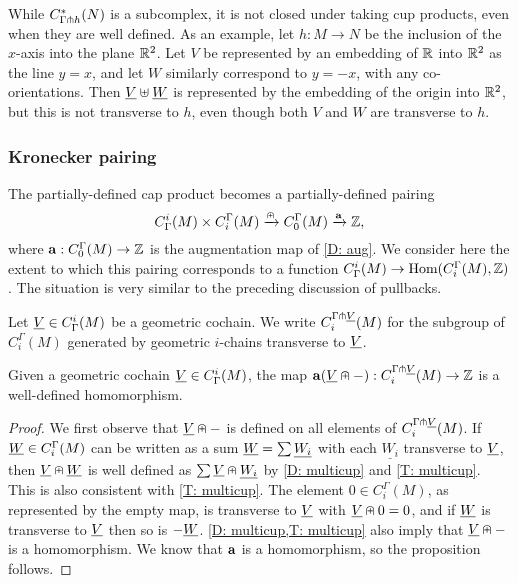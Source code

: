 \begin{remark}
While $C^*_{\Gamma\pitchfork h}(N)$ is a subcomplex, it is not closed under taking cup products, even when they are well defined. As an example, let $h \colon M \to N$ be the inclusion of the $x$-axis into the plane $\mathbb{R}^2$. Let $V$ be represented by an embedding of $\mathbb{R}$ into $\mathbb{R}^2$ as the line $y = x$, and let $W$ similarly correspond to $y = -x$, with any co-orientations. Then $\underline{V} \uplus \underline{W}$ is represented by the embedding of the origin into $\mathbb{R}^2$, but this is not transverse to $h$, even though both $V$ and $W$ are transverse to $h$.
\end{remark}

\subsubsection{Kronecker pairing}

The partially-defined cap product becomes a partially-defined pairing
$$C^i_\Gamma(M) \times C_i^\Gamma(M) \xrightarrow{\nplus} C_0^\Gamma(M) \xrightarrow{\mathbf{a}}\mathbb{Z},$$
where $\mathbf{a}:C_0^\Gamma(M) \to \mathbb{Z}$ is the augmentation map of \cref{D: aug}. We consider here the extent to which this pairing corresponds to a function $C^i_\Gamma(M) \to \textup{Hom}(C_i^\Gamma(M),\mathbb{Z})$. The situation is very similar to the preceding discussion of pullbacks.

\begin{definition}\label{D: transverse to cohain}
Let $\underline{V} \in C^i_\Gamma(M)$ be a geometric cochain.
We write $C_i^{\Gamma\pitchfork \underline{V}}(M)$ for the subgroup of $C_i^\Gamma(M)$ generated by geometric $i$-chains transverse to $\underline{V}$.
\end{definition}

\begin{proposition}
Given a geometric cochain $\underline{V} \in C^i_\Gamma(M)$, the map $\mathbf{a}(\underline{V}\nplus -):C_i^{\Gamma\pitchfork \underline{V}}(M) \to \mathbb{Z}$ is a well-defined homomorphism.
\end{proposition}

\begin{proof}
We first observe that $\underline{V}\nplus -$ is defined on all elements of $C_i^{\Gamma\pitchfork \underline{V}}(M)$.
If $\underline{W} \in C_i^\Gamma(M)$ can be written as a sum $\underline{W} = \sum \underline{W_i}$ with each $\underline{W_i}$ transverse to $\underline{V}$, then $\underline{V}\nplus \underline{W}$ is well defined as $\sum \underline{V}\nplus \underline{W_i}$ by \cref{D: multicup} and \cref{T: multicup}. This is also consistent with \cref{T: multicup}. The element $0 \in C_i^\Gamma(M)$, as represented by the empty map, is transverse to $\underline{V}$ with $\underline{V}\nplus 0 = 0$, and if $\underline{W}$ is transverse to $\underline{V}$ then so is $-\underline{W}$. \cref{D: multicup,T: multicup} also imply that $\underline{V} \nplus -$ is a homomorphism. We know that $\mathbf{a}$ is a homomorphism, so the proposition follows.
\end{proof}

